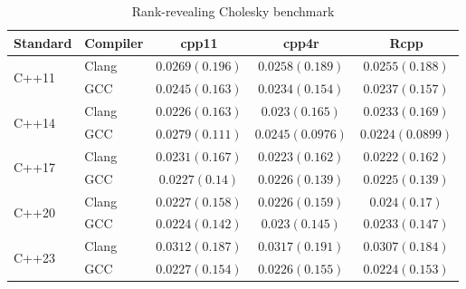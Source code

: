 \begin{table}[H]
\centering
\begingroup\renewcommand{\arraystretch}{1.2}
\begin{tabular}{|l|l|c|c|c|}
\hline
Standard & Compiler & cpp11 & cpp4r & Rcpp \\
\hline
\multirow{2}{*}{C++11} & \multirow{1}{*}{Clang} & $0.0269 (0.196)$ & $0.0258 (0.189)$ & $0.0255 (0.188)$ \\
\cline{2-5}
 & \multirow{1}{*}{GCC} & $0.0245 (0.163)$ & $0.0234 (0.154)$ & $0.0237 (0.157)$ \\
\hline
\multirow{2}{*}{C++14} & \multirow{1}{*}{Clang} & $0.0226 (0.163)$ & $0.023 (0.165)$ & $0.0233 (0.169)$ \\
\cline{2-5}
 & \multirow{1}{*}{GCC} & $0.0279 (0.111)$ & $0.0245 (0.0976)$ & $0.0224 (0.0899)$ \\
\hline
\multirow{2}{*}{C++17} & \multirow{1}{*}{Clang} & $0.0231 (0.167)$ & $0.0223 (0.162)$ & $0.0222 (0.162)$ \\
\cline{2-5}
 & \multirow{1}{*}{GCC} & $0.0227 (0.14)$ & $0.0226 (0.139)$ & $0.0225 (0.139)$ \\
\hline
\multirow{2}{*}{C++20} & \multirow{1}{*}{Clang} & $0.0227 (0.158)$ & $0.0226 (0.159)$ & $0.024 (0.17)$ \\
\cline{2-5}
 & \multirow{1}{*}{GCC} & $0.0224 (0.142)$ & $0.023 (0.145)$ & $0.0233 (0.147)$ \\
\hline
\multirow{2}{*}{C++23} & \multirow{1}{*}{Clang} & $0.0312 (0.187)$ & $0.0317 (0.191)$ & $0.0307 (0.184)$ \\
\cline{2-5}
 & \multirow{1}{*}{GCC} & $0.0227 (0.154)$ & $0.0226 (0.155)$ & $0.0224 (0.153)$ \\
\hline
\end{tabular}
\caption{Rank-revealing Cholesky benchmark}
\endgroup
\end{table}

